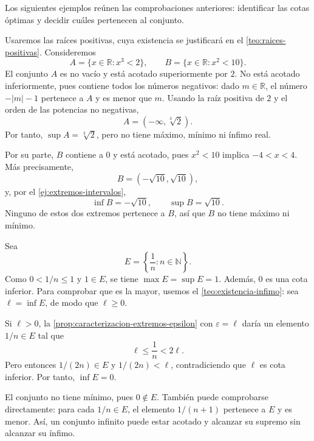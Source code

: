 Los siguientes ejemplos reúnen las comprobaciones anteriores: identificar las cotas óptimas y decidir cuáles pertenecen al conjunto.

\begin{example}
\label{ej:extremos-potencias}
Usaremos las raíces positivas, cuya existencia se justificará en el \cref{teo:raices-positivas}. Consideremos
\[
 A=\{x\in\mathbb{R}:x^3<2\},
 \qquad
 B=\{x\in\mathbb{R}:x^2<10\}.
\]
El conjunto $A$ es no vacío y está acotado superiormente por $2$. No está acotado inferiormente, pues contiene todos los números negativos: dado $m\in\mathbb{R}$, el número $-|m|-1$ pertenece a $A$ y es menor que $m$. Usando la raíz positiva de $2$ y el orden de las potencias no negativas,
\[
 A=(-\infty,\sqrt[3]{2}).
\]
Por tanto, $\sup A=\sqrt[3]{2}$, pero no tiene máximo, mínimo ni ínfimo real.

Por su parte, $B$ contiene a $0$ y está acotado, pues $x^2<10$ implica $-4<x<4$. Más precisamente,
\[
 B=(-\sqrt{10},\sqrt{10}),
\]
y, por el \cref{ej:extremos-intervalos},
\[
 \inf B=-\sqrt{10},
 \qquad
 \sup B=\sqrt{10}.
\]
Ninguno de estos dos extremos pertenece a $B$, así que $B$ no tiene máximo ni mínimo.
\end{example}

\begin{example}
\label{ej:reciprocos-extremos}
Sea
\[
 E=\left\{\frac1n:n\in\mathbb{N}\right\}.
\]
Como $0<1/n\leq1$ y $1\in E$, se tiene $\max E=\sup E=1$. Además, $0$ es una cota inferior. Para comprobar que es la mayor, usemos el \cref{teo:existencia-infimo}: sea $\ell=\inf E$, de modo que $\ell\geq0$.

Si $\ell>0$, la \cref{prop:caracterizacion-extremos-epsilon} con $\varepsilon=\ell$ daría un elemento $1/n\in E$ tal que
\[
 \ell\leq\frac1n<2\ell.
\]
Pero entonces $1/(2n)\in E$ y $1/(2n)<\ell$, contradiciendo que $\ell$ es cota inferior. Por tanto, $\inf E=0$.

El conjunto no tiene mínimo, pues $0\notin E$. También puede comprobarse directamente: para cada $1/n\in E$, el elemento $1/(n+1)$ pertenece a $E$ y es menor. Así, un conjunto infinito puede estar acotado y alcanzar su supremo sin alcanzar su ínfimo.
\end{example}

\begin{center}
\begin{minipage}{\linewidth}
\centering
\captionsetup{hypcap=false}

\label{fig:extremos-conjuntos}
\end{minipage}
\end{center}

